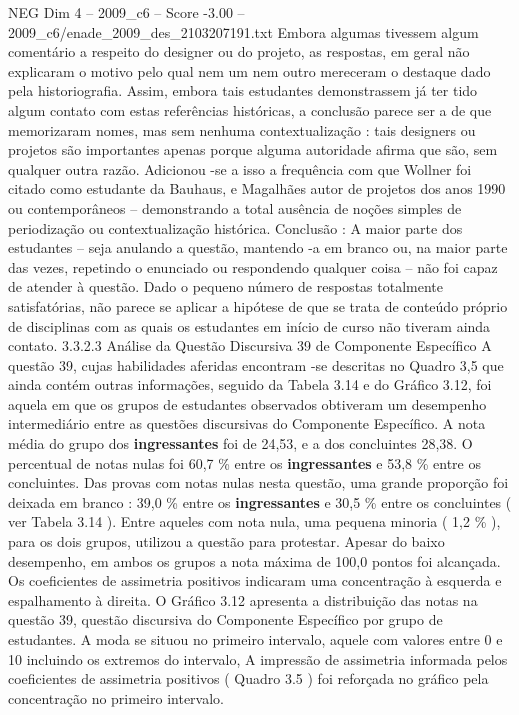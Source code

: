 \begin{textsample}{NEG Dim 4 – 2009\_c6 – Score -3.00 – 2009\_c6/enade\_2009\_des\_2103207191.txt}
Embora algumas tivessem algum comentário a respeito do designer ou do projeto, as respostas, em geral não explicaram o motivo pelo qual nem um nem outro mereceram o destaque dado pela historiografia.
Assim, embora tais estudantes demonstrassem já ter tido algum contato com estas referências históricas, a conclusão parece ser a de que memorizaram nomes, mas sem nenhuma contextualização : tais designers ou projetos são importantes apenas porque alguma autoridade afirma que são, sem qualquer outra razão.
Adicionou -se a isso a frequência com que Wollner foi citado como estudante da Bauhaus, e Magalhães autor de projetos dos anos 1990 ou contemporâneos – demonstrando a total ausência de noções simples de periodização ou contextualização histórica.
Conclusão : A maior parte dos estudantes – seja anulando a questão, mantendo -a em branco ou, na maior parte das vezes, repetindo o enunciado ou respondendo qualquer coisa – não foi capaz de atender à questão.
Dado o pequeno número de respostas totalmente satisfatórias, não parece se aplicar a hipótese de que se trata de conteúdo próprio de disciplinas com as quais os estudantes em início de curso não tiveram ainda contato. 3.3.2.3 Análise da Questão Discursiva 39 de Componente Específico A questão 39, cujas habilidades aferidas encontram -se descritas no Quadro 3,5 que ainda contém outras informações, seguido da Tabela 3.14 e do Gráfico 3.12, foi aquela em que os grupos de estudantes observados obtiveram um desempenho intermediário entre as questões discursivas do Componente Específico.
A nota média do grupo dos \textbf{ingressantes} foi de 24,53, e a dos concluintes 28,38.
O percentual de notas nulas foi 60,7 \% entre os \textbf{ingressantes} e 53,8 \% entre os concluintes.
Das provas com notas nulas nesta questão, uma grande proporção foi deixada em branco : 39,0 \% entre os \textbf{ingressantes} e 30,5 \% entre os concluintes ( ver Tabela 3.14 ).
Entre aqueles com nota nula, uma pequena minoria ( 1,2 \% ), para os dois grupos, utilizou a questão para protestar.
Apesar do baixo desempenho, em ambos os grupos a nota máxima de 100,0 pontos foi alcançada.
Os coeficientes de assimetria positivos indicaram uma concentração à esquerda e espalhamento à direita.
O Gráfico 3.12 apresenta a distribuição das notas na questão 39, questão discursiva do Componente Específico por grupo de estudantes.
A moda se situou no primeiro intervalo, aquele com valores entre 0 e 10 incluindo os extremos do intervalo, A impressão de assimetria informada pelos coeficientes de assimetria positivos ( Quadro 3.5 ) foi reforçada no gráfico pela concentração no primeiro intervalo.

\end{textsample}

